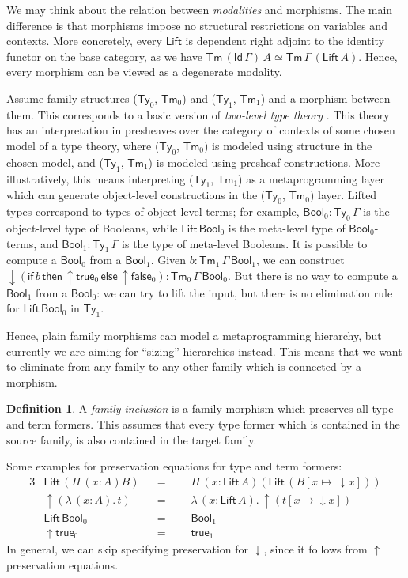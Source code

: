 \documentclass[a4paper,UKenglish,cleveref, autoref, thm-restate]{lipics-v2021}
\theoremstyle{remark}
\theoremstyle{definition}
\newtheorem{mydefinition}{Definition}
\newcommand{\Ty}{\mathsf{Ty}}
\newcommand{\Tm}{\mathsf{Tm}}
\newcommand{\Bool}{\mathsf{Bool}}
\newcommand{\true}{\mathsf{true}}
\newcommand{\false}{\mathsf{false}}
\newcommand{\up}{{\uparrow}}
\newcommand{\down}{{\downarrow}}
\newcommand{\Lift}{\mathsf{Lift}}
\newcommand{\msf}[1]{\mathsf{#1}}
\begin{document}
We may think about the relation between \emph{modalities} and morphisms. The
main difference is that morphisms impose no structural restrictions on variables
and contexts. More concretely, every $\Lift$ is dependent right adjoint
\cite{dependentrightadjoints} to the identity functor on the base category, as
we have $\Tm\,(\msf{Id}\,\Gamma)\,A \simeq \Tm\,\Gamma\,(\Lift\,A)$. Hence,
every morphism can be viewed as a degenerate modality.

Assume family structures ($\Ty_0$, $\Tm_0$) and ($\Ty_1$, $\Tm_1$) and a
morphism between them. This corresponds to a basic version of \emph{two-level
type theory} \cite{twolevel}. This theory has an interpretation in presheaves
over the category of contexts of some chosen model of a type theory, where
($\Ty_0$, $\Tm_0$) is modeled using structure in the chosen model, and ($\Ty_1$,
$\Tm_1$) is modeled using presheaf constructions. More illustratively, this
means interpreting ($\Ty_1$, $\Tm_1$) as a metaprogramming layer which can
generate object-level constructions in the ($\Ty_0$, $\Tm_0$) layer. Lifted
types correspond to types of object-level terms; for example, $\Bool_0 :
\Ty_0\,\Gamma$ is the object-level type of Booleans, while $\Lift\,\Bool_0$ is
the meta-level type of $\Bool_0$-terms, and $\Bool_1 : \Ty_1\,\Gamma$ is the
type of meta-level Booleans. It is possible to compute a $\Bool_0$ from a
$\Bool_1$. Given $b : \Tm_1\,\Gamma\,\Bool_1$, we can construct
$\down(\mathsf{if}\,b\,\mathsf{then}\,\up\true_0\,\mathsf{else}\,\up\false_0) :
\Tm_0\,\Gamma\,\Bool_0$. But there is no way to compute a $\Bool_1$ from a
$\Bool_0$: we can try to lift the input, but there is no elimination rule for
$\Lift\,\Bool_0$ in $\Ty_1$.

Hence, plain family morphisms can model a metaprogramming hierarchy, but
currently we are aiming for ``sizing'' hierarchies instead. This means that we
want to eliminate from any family to any other family which is connected by a
morphism.

\begin{mydefinition}\label{def:inclusion}
A \emph{family inclusion} is a family morphism which preserves all type and term
formers. This assumes that every type former which is contained in the source
family, is also contained in the target family.
\end{mydefinition}

\noindent Some examples for preservation equations for type and term formers:
\begin{alignat*}{3}
  & \Lift\,(\Pi\,(x : A) B)   && =\,\,\,\,&& \Pi\,(x : \Lift\,A)(\Lift\, (B[x \mapsto\,\down x]))\\
  & \up(\lambda\,(x : A).\,t) && =&& \lambda\,(x : \Lift\,A).\,\up(t[x\mapsto\down x])\\
  & \Lift\,\Bool_0            && =&& \Bool_1\\
  & \up\true_0                && =&& \true_1
\end{alignat*}
In general, we can skip specifying preservation for $\down$, since it follows
from $\up$ preservation equations.
\end{document}

